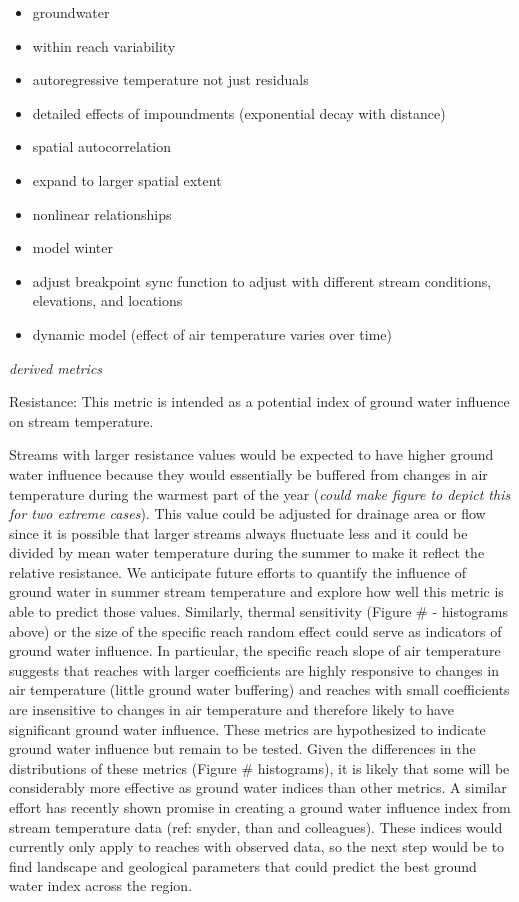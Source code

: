 \documentclass[]{article}
\begin{document}
\begin{itemize}
\itemsep1pt\parskip0pt
\item
  groundwater
\item
  within reach variability
\item
  autoregressive temperature not just residuals
\item
  detailed effects of impoundments (exponential decay with distance)
\item
  spatial autocorrelation
\item
  expand to larger spatial extent
\item
  nonlinear relationships
\item
  model winter
\item
  adjust breakpoint sync function to adjust with different stream
  conditions, elevations, and locations
\item
  dynamic model (effect of air temperature varies over time)
\end{itemize}

\emph{derived metrics}

Resistance: This metric is intended as a potential index of ground water
influence on stream temperature.

Streams with larger resistance values would be expected to have higher
ground water influence because they would essentially be buffered from
changes in air temperature during the warmest part of the year
(\emph{could make figure to depict this for two extreme cases}). This
value could be adjusted for drainage area or flow since it is possible
that larger streams always fluctuate less and it could be divided by
mean water temperature during the summer to make it reflect the relative
resistance. We anticipate future efforts to quantify the influence of
ground water in summer stream temperature and explore how well this
metric is able to predict those values. Similarly, thermal sensitivity
(Figure \# - histograms above) or the size of the specific reach random
effect could serve as indicators of ground water influence. In
particular, the specific reach slope of air temperature suggests that
reaches with larger coefficients are highly responsive to changes in air
temperature (little ground water buffering) and reaches with small
coefficients are insensitive to changes in air temperature and therefore
likely to have significant ground water influence. These metrics are
hypothesized to indicate ground water influence but remain to be tested.
Given the differences in the distributions of these metrics (Figure \#
histograms), it is likely that some will be considerably more effective
as ground water indices than other metrics. A similar effort has
recently shown promise in creating a ground water influence index from
stream temperature data (ref: snyder, than and colleagues). These
indices would currently only apply to reaches with observed data, so the
next step would be to find landscape and geological parameters that
could predict the best ground water index across the region.
\end{document}

